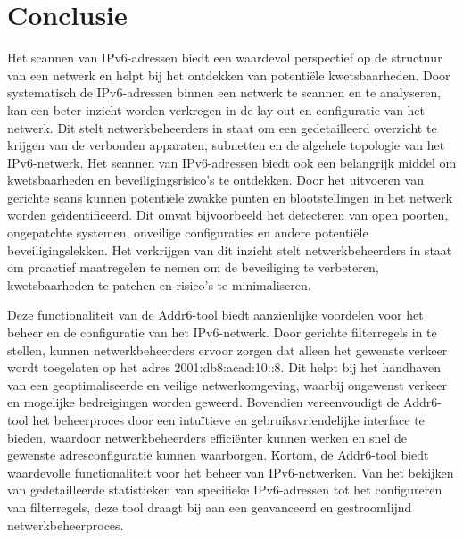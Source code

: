 
\chapter{Conclusie}%
\label{ch:conclusie}




Het scannen van IPv6-adressen biedt een waardevol perspectief op de structuur van een netwerk en helpt bij het ontdekken van potentiële kwetsbaarheden. Door systematisch de IPv6-adressen binnen een netwerk te scannen en te analyseren, kan een beter inzicht worden verkregen in de lay-out en configuratie van het netwerk. Dit stelt netwerkbeheerders in staat om een gedetailleerd overzicht te krijgen van de verbonden apparaten, subnetten en de algehele topologie van het IPv6-netwerk.
Het scannen van IPv6-adressen biedt ook een belangrijk middel om kwetsbaarheden en beveiligingsrisico's te ontdekken. Door het uitvoeren van gerichte scans kunnen potentiële zwakke punten en blootstellingen in het netwerk worden geïdentificeerd. Dit omvat bijvoorbeeld het detecteren van open poorten, ongepatchte systemen, onveilige configuraties en andere potentiële beveiligingslekken. Het verkrijgen van dit inzicht stelt netwerkbeheerders in staat om proactief maatregelen te nemen om de beveiliging te verbeteren, kwetsbaarheden te patchen en risico's te minimaliseren.
\newline

Deze functionaliteit van de Addr6-tool biedt aanzienlijke voordelen voor het beheer en de configuratie van het IPv6-netwerk. Door gerichte filterregels in te stellen, kunnen netwerkbeheerders ervoor zorgen dat alleen het gewenste verkeer wordt toegelaten op het adres 2001:db8:acad:10::8. Dit helpt bij het handhaven van een geoptimaliseerde en veilige netwerkomgeving, waarbij ongewenst verkeer en mogelijke bedreigingen worden geweerd. Bovendien vereenvoudigt de Addr6-tool het beheerproces door een intuïtieve en gebruiksvriendelijke interface te bieden, waardoor netwerkbeheerders efficiënter kunnen werken en snel de gewenste adresconfiguratie kunnen waarborgen.
Kortom, de Addr6-tool biedt waardevolle functionaliteit voor het beheer van IPv6-netwerken. Van het bekijken van gedetailleerde statistieken van specifieke IPv6-adressen tot het configureren van filterregels, deze tool draagt bij aan een geavanceerd en gestroomlijnd netwerkbeheerproces.
\newline

